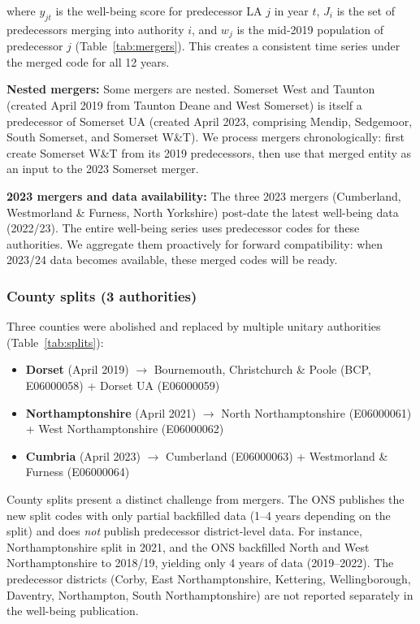 \documentclass[12pt,a4paper]{article}
\begin{document}
where $y_{jt}$ is the well-being score for predecessor LA $j$ in year $t$, $J_i$ is the set of predecessors merging into authority $i$, and $w_j$ is the mid-2019 population of predecessor $j$ (Table~\ref{tab:mergers}). This creates a consistent time series under the merged code for all 12 years.

\textbf{Nested mergers:} Some mergers are nested. Somerset West and Taunton (created April 2019 from Taunton Deane and West Somerset) is itself a predecessor of Somerset UA (created April 2023, comprising Mendip, Sedgemoor, South Somerset, and Somerset W\&T). We process mergers chronologically: first create Somerset W\&T from its 2019 predecessors, then use that merged entity as an input to the 2023 Somerset merger.

\textbf{2023 mergers and data availability:} The three 2023 mergers (Cumberland, Westmorland \& Furness, North Yorkshire) post-date the latest well-being data (2022/23). The entire well-being series uses predecessor codes for these authorities. We aggregate them proactively for forward compatibility: when 2023/24 data becomes available, these merged codes will be ready.

\subsubsection{County splits (3 authorities)}

Three counties were abolished and replaced by multiple unitary authorities (Table~\ref{tab:splits}):

\begin{itemize}
\item \textbf{Dorset} (April 2019) $\to$ Bournemouth, Christchurch \& Poole (BCP, E06000058) + Dorset UA (E06000059)
\item \textbf{Northamptonshire} (April 2021) $\to$ North Northamptonshire (E06000061) + West Northamptonshire (E06000062)
\item \textbf{Cumbria} (April 2023) $\to$ Cumberland (E06000063) + Westmorland \& Furness (E06000064)
\end{itemize}

County splits present a distinct challenge from mergers. The ONS publishes the new split codes with only partial backfilled data (1--4 years depending on the split) and does \textit{not} publish predecessor district-level data. For instance, Northamptonshire split in 2021, and the ONS backfilled North and West Northamptonshire to 2018/19, yielding only 4 years of data (2019--2022). The predecessor districts (Corby, East Northamptonshire, Kettering, Wellingborough, Daventry, Northampton, South Northamptonshire) are not reported separately in the well-being publication.
\end{document}

